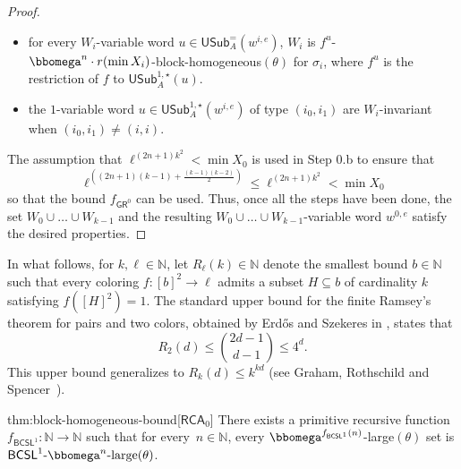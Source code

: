 \documentclass{article}
\numberwithin{theorem}{section}
\newcommand{\RCA}{\mathsf{RCA}}
\newcommand{\GR}{\mathsf{GR}}
\newcommand{\NN}{\mathbb{N}}
\newcommand{\USub}{\mathsf{USub}}
\newcommand{\BCSL}{\mathsf{BCSL}}
\newcommand{\BlockCSL}[1]{\BCSL^1\text{-}#1\text{-large}(\theta)}
\begin{document}
\begin{proof}
\begin{itemize}
    \item for every $W_i$-variable word $u \in \USub_A^{=}(w^{i,e})$, $W_i$ is $f^u$-$\bbomega^n\cdot r(\min X_i)$-block-homogeneous$(\theta)$ for $\sigma_i$, where $f^u$ is the restriction of $f$ to $\USub^{1,\star}_A(u)$.
    
    \item the $1$-variable word $u \in \USub_A^{1,\star}(w^{i,e})$ of type $(i_0,i_1)$ are $W_i$-invariant when $(i_0,i_1) \neq (i,i)$.
\end{itemize}

The assumption that $\ell^{(2n+1)k^2} < \min X_0$ is used in Step 0.b to ensure that $$\ell^{\left((2n+1)(k-1) + \frac{(k-1)(k-2)}{2}\right)} \leq \ell^{(2n+1)k^2} < \min X_0$$ so that the bound $f_{\GR^0}$ can be used.
Thus, once all the steps have been done, the set $W_0 \cup \dots \cup W_{k-1}$ and the resulting $W_0 \cup \dots \cup W_{k-1}$-variable word $w^{0,e}$ satisfy the desired properties.
\end{proof}

In what follows, for $k, \ell \in \NN$, let $R_{\ell}(k) \in \NN$ denote the smallest bound $b \in \NN$ such that every coloring $f : [b]^2 \to \ell$ admits a subset $H \subseteq b$ of cardinality $k$ satisfying $f([H]^2) = 1$. 
The standard upper bound for the finite Ramsey's theorem for pairs and two colors, obtained by Erd\H{o}s and Szekeres in \cite{erdos1935combinatorial}, states that $$R_2(d) \leq \binom{2d-1}{d-1} \leq 4^{d}.$$ This upper bound generalizes to $R_k(d) \leq k^{kd}$ (see Graham, Rothschild and Spencer~\cite[Section 1.1]{graham2013ramsey}).


\begin{reptheorem}{thm:block-homogeneous-bound}[$\RCA_0$]
    There exists a primitive recursive function $f_{\BCSL^1} : \NN \to \NN$ such that for every~$n \in \NN$, every $\bbomega^{f_{\BCSL^1}(n)}$-large$(\theta)$ set is $\BlockCSL{\bbomega^n}$.
\end{reptheorem}
\end{document}
